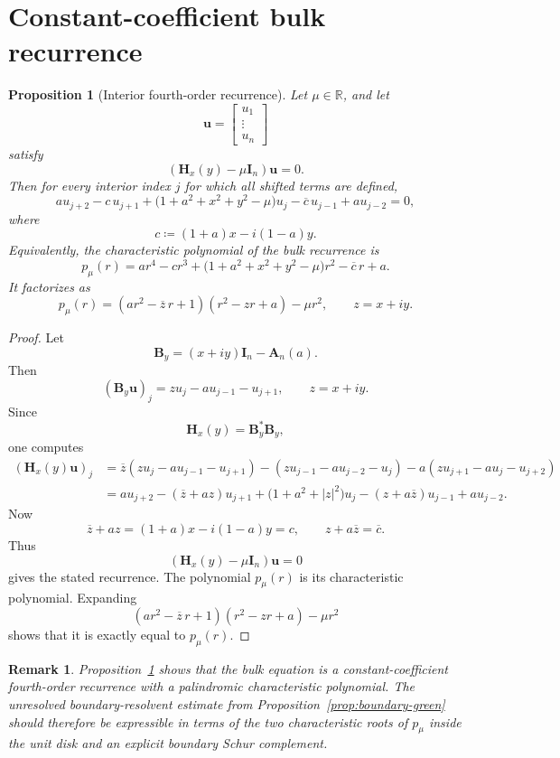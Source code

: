 \documentclass[11pt]{article}
\newtheorem{proposition}[theorem]{Proposition}
\newtheorem{remark}[theorem]{Remark}
\begin{document}
\section{Constant-coefficient bulk recurrence}

\begin{proposition}[Interior fourth-order recurrence]\label{prop:bulk-recurrence}
Let \(\mu\in\mathbb R\), and let
\[
\mathbf u=
\begin{bmatrix}
u_1\\
\vdots\\
u_n
\end{bmatrix}
\]
satisfy
\[
(\mathbf H_x(y)-\mu\mathbf I_n)\mathbf u=0.
\]
Then for every interior index \(j\) for which all shifted terms are defined,
\[
a u_{j+2}
-c\,u_{j+1}
+
\bigl(1+a^2+x^2+y^2-\mu\bigr)u_j
-\overline c\,u_{j-1}
+a u_{j-2}
=0,
\]
where
\[
c\coloneqq (1+a)x-i(1-a)y.
\]
Equivalently, the characteristic polynomial of the bulk recurrence is
\[
p_\mu(r)
=
a r^4-c r^3+\bigl(1+a^2+x^2+y^2-\mu\bigr)r^2-\overline c\,r+a.
\]
It factorizes as
\[
\boxed{
p_\mu(r)
=
(ar^2-\overline z\,r+1)(r^2-zr+a)-\mu r^2,
\qquad
z=x+iy.
}
\]
\end{proposition}

\begin{proof}
Let
\[
\mathbf B_y=(x+iy)\mathbf I_n-\mathbf A_n(a).
\]
Then
\[
(\mathbf B_y\mathbf u)_j
=
zu_j-a u_{j-1}-u_{j+1},
\qquad z=x+iy.
\]
Since
\[
\mathbf H_x(y)=\mathbf B_y^*\mathbf B_y,
\]
one computes
\begin{align*}
(\mathbf H_x(y)\mathbf u)_j
&=
\overline z(zu_j-a u_{j-1}-u_{j+1})
-(zu_{j-1}-a u_{j-2}-u_j)
-a(zu_{j+1}-a u_j-u_{j+2}) \\
&=
a u_{j+2}
-(\overline z+a z)u_{j+1}
+\bigl(1+a^2+|z|^2\bigr)u_j
-(z+a\overline z)u_{j-1}
+a u_{j-2}.
\end{align*}
Now
\[
\overline z+a z=(1+a)x-i(1-a)y=c,
\qquad
z+a\overline z=\overline c.
\]
Thus
\[
(\mathbf H_x(y)-\mu\mathbf I_n)\mathbf u=0
\]
gives the stated recurrence. The polynomial \(p_\mu(r)\) is its characteristic polynomial. Expanding
\[
(ar^2-\overline z\,r+1)(r^2-zr+a)-\mu r^2
\]
shows that it is exactly equal to \(p_\mu(r)\).
\end{proof}

\begin{remark}
Proposition~\ref{prop:bulk-recurrence} shows that the bulk equation is a constant-coefficient fourth-order recurrence with a palindromic characteristic polynomial. The unresolved boundary-resolvent estimate from Proposition~\ref{prop:boundary-green} should therefore be expressible in terms of the two characteristic roots of \(p_\mu\) inside the unit disk and an explicit boundary Schur complement.
\end{remark}
\end{document}
